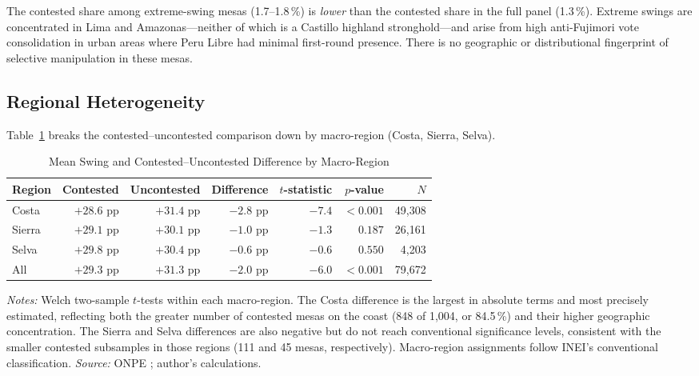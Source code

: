 The contested share among extreme-swing mesas (1.7--1.8\,\%) is
\emph{lower} than the contested share in the full panel (1.3\,\%).
Extreme swings are concentrated in Lima and Amazonas---neither of which
is a Castillo highland stronghold---and arise from high anti-Fujimori
vote consolidation in urban areas where Peru Libre had minimal first-round
presence. There is no geographic or distributional fingerprint of selective
manipulation in these mesas.

\subsection{Regional Heterogeneity}
\label{app:swing:regional}

Table~\ref{tab:a4_regional} breaks the contested--uncontested comparison
down by macro-region (Costa, Sierra, Selva).

\begin{table}[H]
\centering
\caption{Mean Swing and Contested--Uncontested Difference by Macro-Region}
\label{tab:a4_regional}
\begin{tabular}{lrrrrrr}
\toprule
Region & Contested & Uncontested & Difference
       & $t$-statistic & $p$-value & $N$ \\
\midrule
Costa  & $+28.6$ pp & $+31.4$ pp & $-2.8$ pp & $-7.4$ & $<0.001$ & 49,308 \\
Sierra & $+29.1$ pp & $+30.1$ pp & $-1.0$ pp & $-1.3$ & $0.187$  & 26,161 \\
Selva  & $+29.8$ pp & $+30.4$ pp & $-0.6$ pp & $-0.6$ & $0.550$  & 4,203 \\
\midrule
All    & $+29.3$ pp & $+31.3$ pp & $-2.0$ pp & $-6.0$ & $<0.001$ & 79,672 \\
\bottomrule
\end{tabular}
\vspace{0.2cm}
\begin{minipage}{\textwidth}
\footnotesize
\textit{Notes:} Welch two-sample $t$-tests within each macro-region.
The Costa difference is the largest in absolute terms and most precisely
estimated, reflecting both the greater number of contested mesas on
the coast (848 of 1,004, or 84.5\,\%) and their higher geographic
concentration.
The Sierra and Selva differences are also negative but do not reach
conventional significance levels, consistent with the smaller
contested subsamples in those regions (111 and 45 mesas, respectively).
Macro-region assignments follow INEI's conventional classification.
\textit{Source:} ONPE \citep{onpe2021, onpe2021a}; author's calculations.
\end{minipage}
\end{table}


